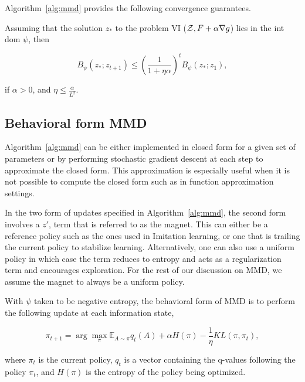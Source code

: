 \hfill \break
Algorithm~\ref{alg:mmd} provides the following convergence guarantees.

\begin{theorem}
	\label{thm:mmdconv}
	\cite[Theorem 3.4]{sokotaUnified2023}
	Assuming that the solution $z_{\ast}$ to the problem VI ($\mathcal{Z}, F + \alpha \nabla g$) lies in the
	int dom $\psi$, then

	\[ B_{\psi} (z_{\ast}; z_{t + 1}) \leq {\left(\frac{1}{1 +
				\eta \alpha}\right)}^t B_{\psi} (z_{\ast}; z_1), \]

	if $\alpha > 0$, and $\eta
		\leq \frac{\alpha}{L^2}$.
\end{theorem}

\subsection{Behavioral form MMD}

Algorithm~\ref{alg:mmd} can be either implemented in closed form for a given set of parameters or
by performing stochastic gradient descent at each step to approximate the closed form.
This approximation is especially useful when it is not possible to compute the closed form such as
in function approximation settings.

In the two form of updates specified in Algorithm~\ref{alg:mmd}, the second form involves a $z'$,
term that is referred to as the magnet.
This can either be a reference policy such as the ones used in Imitation learning, or one that is
trailing the current policy to stabilize learning.
Alternatively, one can also use a uniform policy in which case the term reduces to entropy and acts
as a regularization term and encourages exploration.
For the rest of our discussion on MMD, we assume the magnet to always be a uniform policy.

With $\psi$ taken to be negative entropy, the behavioral form of MMD is to perform the following
update at each information state,

\begin{equation}
	\label{eqn:mmdbf} \pi_{t+1}
	= \arg \max_{\pi} \mathbb{E}_{A \sim \pi} q_t(A) + \alpha H(\pi) - \frac{1}{\eta} KL(\pi, \pi_t),
\end{equation}

where $\pi_t$ is the current policy, $q_t$ is a vector
containing the q-values following the policy $\pi_t$, and $H(\pi)$ is the entropy of the policy
being optimized.


